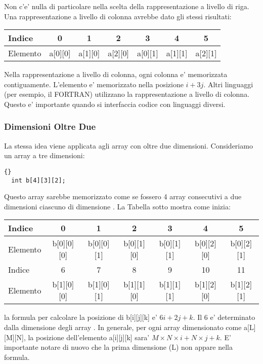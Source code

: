 Non c'e' nulla di particolare nella scelta della rappresentazione a livello
di riga. Una rappresentazione a livello di colonna avrebbe dato gli stessi
risultati:

\parbox{\textwidth}{
\vspace{0.5em}
\centering
\begin{tabular}{||l|c|c|c|c|c|c||}
\hline
Indice & 0 & 1 & 2 & 3 & 4 & 5 \\
\hline
Elemento & a[0][0] & a[1][0] & a[2][0] & a[0][1] & a[1][1] & a[2][1]  \\
\hline
\end{tabular}
\vspace{0.5em}
}
\noindent Nella rappresentazione a livello di colonna, ogni colonna e'
memorizzata contiguamente. L'elemento {\code [i][j]} e' memorizzato nella
posizione $i + 3j$. Altri linguaggi (per esempio, il FORTRAN) utilizzano 
la rappresentazione a livello di colonna. Questo e' importante quando si
interfaccia codice con linguaggi diversi.  

\subsubsection{Dimensioni Oltre Due}
La stessa idea viene applicata agli array con oltre due dimensioni. Consideriamo
un array a tre dimensioni:
\begin{lstlisting}[stepnumber=0]{}
  int b[4][3][2];
\end{lstlisting}
Questo array sarebbe memorizzato come se fossero 4 array consecutivi a due 
dimensioni ciascuno di dimensione {\code [3][2]}. La Tabella sotto mostra
come inizia:

\parbox{\textwidth}{
\vspace{0.5em}
\centering
\begin{tabular}{||l|c|c|c|c|c|c||}
\hline
Indice & 0 & 1 & 2 & 3 & 4 & 5  \\
\hline
Elemento & b[0][0][0] & b[0][0][1]  & b[0][1][0] & b[0][1][1] & b[0][2][0]
&  b[0][2][1]  \\
\hline
\hline
Indice & 6 & 7 & 8 & 9 & 10 & 11 \\
\hline
Elemento & b[1][0][0] & b[1][0][1] & b[1][1][0] & b[1][1][1]  & b[1][2][0] 
& b[1][2][1] \\
\hline
\end{tabular}
\vspace{0.5em}
}
\noindent la formula per calcolare la posizione di {\code b[i][j][k]}
e' $6i + 2j + k$. Il 6 e' determinato dalla dimensione degli array
{\code [3][2]}. In generale, per ogni array dimensionato come
{\code a[L][M][N]}, la posizione dell'elemento {\code a[i][j][k]} sara'
$M\times N\times i + N \times j + k$. E' importante notare di nuovo
che la prima dimensione ({\code L}) non appare nella formula.

